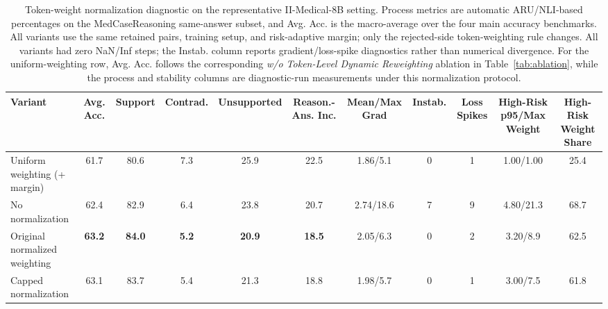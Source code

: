 \documentclass[a4paper,fleqn,doubleblind]{cas-sc}
\begin{document}
\begin{table}[htbp]
    \centering
    \scriptsize
    \setlength{\tabcolsep}{3pt}
    \caption{Token-weight normalization diagnostic on the representative II-Medical-8B setting. Process metrics are automatic ARU/NLI-based percentages on the MedCaseReasoning same-answer subset, and Avg. Acc. is the macro-average over the four main accuracy benchmarks. All variants use the same retained pairs, training setup, and risk-adaptive margin; only the rejected-side token-weighting rule changes. All variants had zero NaN/Inf steps; the Instab. column reports gradient/loss-spike diagnostics rather than numerical divergence. For the uniform-weighting row, Avg. Acc. follows the corresponding \textit{w/o Token-Level Dynamic Reweighting} ablation in Table~\ref{tab:ablation}, while the process and stability columns are diagnostic-run measurements under this normalization protocol.}
    \label{tab:normalization_stability_diagnostic}
    \begin{adjustbox}{max width=\textwidth}
    \begin{tabular}{lcccccccccc}
        \toprule
        \textbf{Variant} & \textbf{Avg. Acc.} & \textbf{Support} & \textbf{Contrad.} & \textbf{Unsupported} & \textbf{Reason.-Ans. Inc.} & \textbf{Mean/Max Grad} & \textbf{Instab.} & \textbf{Loss Spikes} & \textbf{High-Risk p95/Max Weight} & \textbf{High-Risk Weight Share} \\
        \midrule
        Uniform weighting (+ margin) & 61.7 & 80.6 & 7.3 & 25.9 & 22.5 & 1.86/5.1 & 0 & 1 & 1.00/1.00 & 25.4 \\
        No normalization & 62.4 & 82.9 & 6.4 & 23.8 & 20.7 & 2.74/18.6 & 7 & 9 & 4.80/21.3 & 68.7 \\
        Original normalized weighting & \textbf{63.2} & \textbf{84.0} & \textbf{5.2} & \textbf{20.9} & \textbf{18.5} & 2.05/6.3 & 0 & 2 & 3.20/8.9 & 62.5 \\
        Capped normalization & 63.1 & 83.7 & 5.4 & 21.3 & 18.8 & 1.98/5.7 & 0 & 1 & 3.00/7.5 & 61.8 \\
        \bottomrule
    \end{tabular}
    \end{adjustbox}
\end{table}
\end{document}
